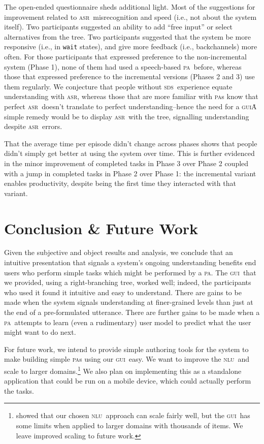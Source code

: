 \documentclass[11pt]{article}
\newcommand{\sds}[0]{\textsc{sds}}
\newcommand{\nlu}[0]{\textsc{nlu}}
\newcommand{\asr}[0]{\textsc{asr}}
\newcommand{\ui}[0]{\textsc{gui}}
\newcommand{\pa}[0]{\textsc{pa}}
\begin{document}
The open-ended questionnaire sheds additional light. Most of the suggestions for improvement related to \asr\ misrecognition and speed (i.e., not about the system itself). Two participants suggested an ability to add ``free input'' or select alternatives from the tree. Two participants suggested that the system be more responsive (i.e., in \texttt{wait} states), and give more feedback (i.e., backchannels) more often. For those participants that expressed preference to the non-incremental system (Phase 1), none of them had used a speech-based \pa\ before, whereas those that expressed preference to the incremental versions (Phases 2 and 3) use them regularly. We conjecture that people without \sds\ experience equate understanding with \asr, whereas those that are more familiar with \pa s know that perfect \asr\ doesn't translate to perfect understanding--hence the need for a \ui\. A simple remedy would be to display \asr\ with the tree, signalling understanding despite \asr\ errors.

That the average time per episode didn't change across phases shows that people didn't simply get better at using the system over time. This is further evidenced in the minor improvement of completed tasks in Phase 3 over Phase 2 coupled with a jump in completed tasks in Phase 2 over Phase 1: the incremental variant enables productivity, despite being the first time they interacted with that variant.

\section{Conclusion \& Future Work}

Given the subjective and object results and analysis, we conclude that an intuitive presentation that signals a system's ongoing understanding benefits end users who perform simple tasks which might be performed by a \pa. The \ui\ that we provided, using a right-branching tree, worked well; indeed, the participants who used it found it intuitive and easy to understand. There are gains to be made when the system signals understanding at finer-grained levels than just at the end of a pre-formulated utterance. There are further gains to be made when a \pa\ attempts to learn (even a rudimentary) user model to predict what the user might want to do next. 

For future work, we intend to provide simple authoring tools for the system to make building simple \pa s using our \ui\ easy. We want to improve the \nlu\ and scale to larger domains.\footnote{ showed that our chosen \nlu\ approach can scale fairly well, but the \ui\ has some limits when applied to larger domains with thousands of items. We leave improved scaling to future work.} We also plan on implementing this as a standalone application that could be run on a mobile device, which could actually perform the tasks.
\end{document}
